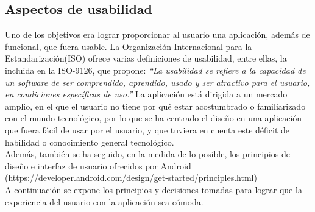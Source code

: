 \documentclass[11pt,a4paper]{report}
\begin{document}
\subsection{Aspectos de usabilidad}
Uno de los objetivos era lograr proporcionar al usuario una aplicación, además de funcional, que fuera usable. La Organización Internacional para la Estandarización(ISO) ofrece varias definiciones de usabilidad, entre ellas, la incluida en la ISO-9126, que propone:
\textit{``La usabilidad se refiere a la capacidad de un software de ser comprendido, aprendido, usado y ser atractivo para el usuario, en condiciones específicas de uso.''} La aplicación está dirigida a un mercado amplio, en el que el usuario no tiene por qué estar acostumbrado o familiarizado con el mundo tecnológico, por lo que se ha centrado el diseño en una aplicación que fuera fácil de usar por el usuario, y que tuviera en cuenta este déficit de habilidad o conocimiento general tecnológico. 
\\Además, también se ha seguido, en la medida de lo posible, los principios de diseño e interfaz de usuario ofrecidos por Android (\url{https://developer.android.com/design/get-started/principles.html})
\\A continuación se expone los principios y decisiones tomadas para lograr que la experiencia del usuario con la aplicación sea cómoda.
\end{document}
